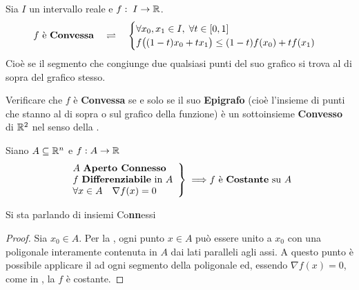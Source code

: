 \begin{definition}
	Sia $I$ un intervallo reale e $f:\; I \to \mathbb{R}$.
	\begin{equation*}
		f \text{ è \textbf{Convessa}}
		\quad \rightleftharpoons \quad
		\begin{cases}
			\forall x_0, x_1 \in I,\; \forall t \in \left[0,1\right]\\
			f \bigl( (1-t)x_0 + t x_1 \bigr) \leq (1-t) f(x_0) + t f(x_1)
		\end{cases}
	\end{equation*}
	Cioè se il segmento che congiunge due qualsiasi punti del suo grafico si trova al di sopra del grafico stesso.
\end{definition}
\begin{exercise}
	Verificare che $f$ è \textbf{Convessa} se e solo se il suo \textbf{Epigrafo} (cioè l'insieme di punti che stanno al di sopra o sul grafico della funzione)
	è un sottoinsieme \textbf{Convesso} di $\mathbb{R}^2$ nel senso della .
\end{exercise}
\begin{proposition}
	Siano $A \subseteq \mathbb{R}^n$ e $f: A \to \mathbb{R}$
	\[
		\left.
			\begin{array}{l}
				A \text{ \textbf{Aperto Connesso}}\\
				f \text{ \textbf{Differenziabile} in } A\\
				\forall x \in A \quad \nabla f(x) = 0
			\end{array}
		\right\}
		\implies\\
		f \text{ è \textbf{Costante} su } A
	\]
	\vspace*{-\baselineskip}
	\begin{note}
		Si sta parlando di insiemi Co\textbf{nn}essi
	\end{note}
	\begin{proof}
		Sia $x_0 \in A$. Per la , ogni punto $x \in A$ può essere unito a $x_0$ con una poligonale interamente contenuta in $A$ dai lati paralleli agli assi. A questo punto è possibile applicare il  ad ogni segmento della poligonale ed, essendo $\nabla f(x) = 0$, come in , la $f$ è costante.
	\end{proof}
\end{proposition}

\newpage
